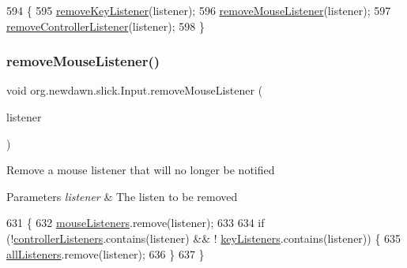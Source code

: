 \begin{DoxyCode}
594                                                        \{
595         \mbox{\hyperlink{classorg_1_1newdawn_1_1slick_1_1_input_ae57dc0f6e6f76b1865912bf556e9cc8f}{removeKeyListener}}(listener);
596         \mbox{\hyperlink{classorg_1_1newdawn_1_1slick_1_1_input_a216074fd5c9a214bebb55d74176166ae}{removeMouseListener}}(listener);
597         \mbox{\hyperlink{classorg_1_1newdawn_1_1slick_1_1_input_acd102385907c4fa71c55aa32c4f22035}{removeControllerListener}}(listener);
598     \}
\end{DoxyCode}
\mbox{\label{classorg_1_1newdawn_1_1slick_1_1_input_a216074fd5c9a214bebb55d74176166ae}} 
\subsubsection{\texorpdfstring{remove\+Mouse\+Listener()}{removeMouseListener()}}
{\footnotesize\ttfamily void org.\+newdawn.\+slick.\+Input.\+remove\+Mouse\+Listener (\begin{DoxyParamCaption}\item[{\mbox{\hyperlink{interfaceorg_1_1newdawn_1_1slick_1_1_mouse_listener}{Mouse\+Listener}}}]{listener }\end{DoxyParamCaption})\hspace{0.3cm}{\ttfamily [inline]}}

Remove a mouse listener that will no longer be notified


\begin{DoxyParams}{Parameters}
{\em listener} & The listen to be removed \\
\hline
\end{DoxyParams}

\begin{DoxyCode}
631                                                             \{
632         \mbox{\hyperlink{classorg_1_1newdawn_1_1slick_1_1_input_a14f9c58eb48c498073f11c6934d92998}{mouseListeners}}.remove(listener);
633         
634         \textcolor{keywordflow}{if} (!\mbox{\hyperlink{classorg_1_1newdawn_1_1slick_1_1_input_a762495b937bf0e42b5dbfaa29bdb1b98}{controllerListeners}}.contains(listener) && !
      \mbox{\hyperlink{classorg_1_1newdawn_1_1slick_1_1_input_a9a68e6a9e9441fea9793f57603be2f96}{keyListeners}}.contains(listener)) \{
635             \mbox{\hyperlink{classorg_1_1newdawn_1_1slick_1_1_input_a26d5ed77d8b0444118d630336d0ab6d7}{allListeners}}.remove(listener);
636         \}
637     \}
\end{DoxyCode}
\mbox{\label{classorg_1_1newdawn_1_1slick_1_1_input_a9e904f004c40cec0088f90f24fa09762}} 
